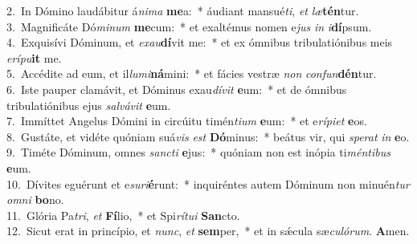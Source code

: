 {2.~}In Dómino laudábitur á\textit{ni}\textit{ma} \textbf{me}a:~* áudiant mansué\textit{ti}, \textit{et} \textit{læ}\textbf{tén}tur.\\
{3.~}Magnificáte Dó\textit{mi}\textit{num} \textbf{me}cum:~* et exaltémus nomen e\textit{jus} \textit{in} \textit{i}\textbf{dí}psum.\\
{4.~}Exquisívi Dóminum, et \textit{e}\textit{xau}\textbf{dí}vit me:~* et ex ómnibus tribulatiónibus meis \textit{e}\textit{rí}\textit{pu}\textbf{it} me.\\
{5.~}Accédite ad eum, et il\textit{lu}\textit{mi}\textbf{ná}mini:~* et fácies vestræ \textit{non} \textit{con}\textit{fun}\textbf{dén}tur.\\
{6.~}Iste pauper clamávit, et Dóminus exau\textit{dí}\textit{vit} \textbf{e}um:~* et de ómnibus tribulatiónibus ejus \textit{sal}\textit{vá}\textit{vit} \textbf{e}um.\\
{7.~}Immíttet Angelus Dómini in circúitu timén\textit{ti}\textit{um} \textbf{e}um:~* et e\textit{rí}\textit{pi}\textit{et} \textbf{e}os.\\
{8.~}Gustáte, et vidéte quóniam suá\textit{vis} \textit{est} \textbf{Dó}minus:~* beátus vir, qui \textit{spe}\textit{rat} \textit{in} \textbf{e}o.\\
{9.~}Timéte Dóminum, omnes \textit{san}\textit{cti} \textbf{e}jus:~* quóniam non est inópia ti\textit{mén}\textit{ti}\textit{bus} \textbf{e}um.\\
{10.~}Dívites eguérunt et e\textit{su}\textit{ri}\textbf{é}runt:~* inquiréntes autem Dóminum non minuén\textit{tur} \textit{om}\textit{ni} \textbf{bo}no.\\
{11.~}Glória Pa\textit{tri}, \textit{et} \textbf{Fí}lio,~* et Spi\textit{rí}\textit{tu}\textit{i} \textbf{San}cto.\\
{12.~}Sicut erat in princípio, et \textit{nunc}, \textit{et} \textbf{sem}per,~* et in sǽcula sæ\textit{cu}\textit{ló}\textit{rum}. \textbf{A}men.\\
